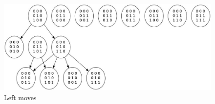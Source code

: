 \documentclass[11pt, a4paper]{article}
\theoremstyle{plain}
\theoremstyle{definition}
\theoremstyle{remark}
\begin{document}
\begin{figure}
\includegraphics[scale=0.50, angle=00]{graph_leftmost_left.jpg}
\caption{Left moves}
\label{graph:leftmost_left}
\end{figure}
\end{document}
